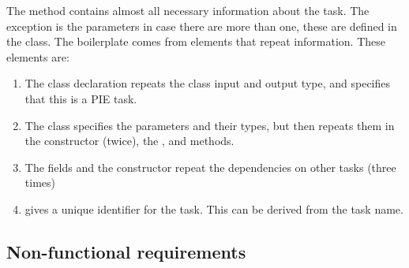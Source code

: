 The  method contains almost all necessary information about the task.
The exception is the parameters in case there are more than one, these are defined in the  class.
The boilerplate comes from elements that repeat information. These elements are:
\begin{enumerate}
  \item The class declaration repeats the class input and output type, and specifies that this is a \ac{PIE} task.
  \item The  class specifies the parameters and their types, but then repeats them in the constructor (twice), the ,  and  methods.
  \item The fields and the constructor repeat the dependencies on other tasks (three times)
  \item {} gives a unique identifier for the task.
  This can be derived from the task name.
\end{enumerate}

\subsection{Non-functional requirements}
\label{subsec:evaluation__analysis__non_functional_requirements}

